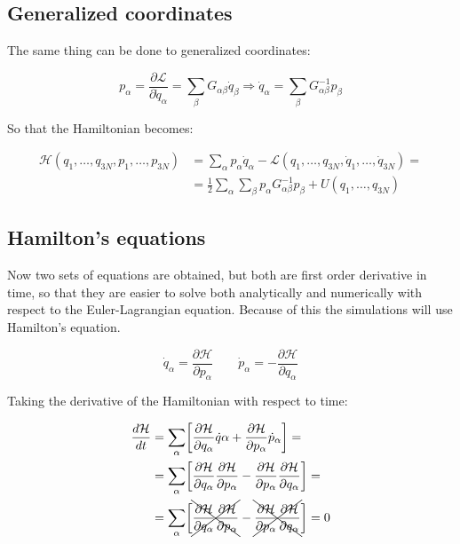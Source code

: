 	\subsection{Generalized coordinates}
	The same thing can be done to generalized coordinates:

	$$p_\alpha = \frac{\partial\mathcal{L}}{\partial\dot{q}_\alpha} = \sum\limits_\beta G_{\alpha\beta}\dot{q}_\beta\Rightarrow \dot{q}_\alpha = \sum\limits_\beta G^{-1}_{\alpha\beta}p_\beta$$

	So that the Hamiltonian becomes:

	\begin{align*}
		\mathcal{H}(q_1, \dots, q_{3N}, p_1, \dots, p_{3N}) &= \sum\limits_\alpha p_\alpha\dot{q}_\alpha - \mathcal{L}(q_1, \dots, q_{3N}, \dot{q}_1, \dots, \dot{q}_{3N}) =\\
																												&=\frac{1}{2}\sum\limits_\alpha\sum\limits_\beta p_\alpha G_{\alpha\beta}^{-1}p_\beta + U(q_1, \dots, q_{3N})
	\end{align*}

	\subsection{Hamilton's equations}
	Now two sets of equations are obtained, but both are first order derivative in time, so that they are easier to solve both analytically and numerically with respect to the Euler-Lagrangian equation.
	Because of this the simulations will use Hamilton's equation.

	$$\dot{q}_\alpha = \frac{\partial\mathcal{H}}{\partial p_\alpha}\qquad\dot{p}_\alpha = -\frac{\partial\mathcal{H}}{\partial q_\alpha}$$

	Taking the derivative of the Hamiltonian with respect to time:

	\begin{align*}
		\frac{d\mathcal{H}}{dt} &= \sum\limits_\alpha\biggl[\frac{\partial\mathcal{H}}{\partial q_\alpha}\dot{q}\alpha + \frac{\partial\mathcal{H}}{\partial p_\alpha}\dot{p}_\alpha\biggr] =\\
														&= \sum\limits_\alpha\biggl[\frac{\partial\mathcal{H}}{\partial q_\alpha}\frac{\partial\mathcal{H}}{\partial p_\alpha} - \frac{\partial\mathcal{H}}{\partial p_\alpha}\frac{\partial\mathcal{H}}{\partial q_\alpha}\biggr] =\\
														&= \sum\limits_\alpha\biggl[\xcancel{\frac{\partial\mathcal{H}}{\partial q_\alpha}\frac{\partial\mathcal{H}}{\partial p_\alpha}} - \xcancel{\frac{\partial\mathcal{H}}{\partial p_\alpha}\frac{\partial\mathcal{H}}{\partial q_\alpha}}\biggr] = 0
	\end{align*}

